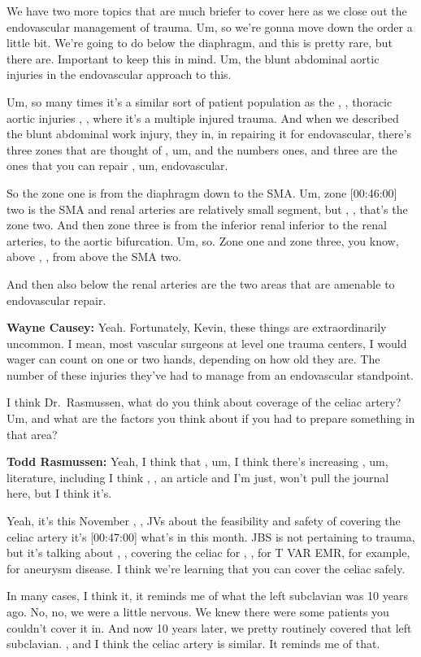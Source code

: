 \documentclass[
]{book}
\begin{document}
We have two more topics that are much briefer to cover here as we close
out the endovascular management of trauma. Um, so we're gonna move down
the order a little bit. We're going to do below the diaphragm, and this
is pretty rare, but there are. Important to keep this in mind. Um, the
blunt abdominal aortic injuries in the endovascular approach to this.

Um, so many times it's a similar sort of patient population as the , ,
thoracic aortic injuries , , where it's a multiple injured trauma. And
when we described the blunt abdominal work injury, they in, in repairing
it for endovascular, there's three zones that are thought of , um, and
the numbers ones, and three are the ones that you can repair , um,
endovascular.

So the zone one is from the diaphragm down to the SMA. Um, zone
{[}00:46:00{]} two is the SMA and renal arteries are relatively small
segment, but , , that's the zone two. And then zone three is from the
inferior renal inferior to the renal arteries, to the aortic
bifurcation. Um, so. Zone one and zone three, you know, above , , from
above the SMA two.

And then also below the renal arteries are the two areas that are
amenable to endovascular repair.

\textbf{Wayne Causey:} Yeah. Fortunately, Kevin, these things are
extraordinarily uncommon. I mean, most vascular surgeons at level one
trauma centers, I would wager can count on one or two hands, depending
on how old they are. The number of these injuries they've had to manage
from an endovascular standpoint.

I think Dr.~Rasmussen, what do you think about coverage of the celiac
artery? Um, and what are the factors you think about if you had to
prepare something in that area?

\textbf{Todd Rasmussen:} Yeah, I think that , um, I think there's increasing
, um, literature, including I think , , an article and I'm just, won't
pull the journal here, but I think it's.

Yeah, it's this November , , JVs about the feasibility and safety of
covering the celiac artery it's {[}00:47:00{]} what's in this month. JBS is
not pertaining to trauma, but it's talking about , , covering the celiac
for , , for T VAR EMR, for example, for aneurysm disease. I think we're
learning that you can cover the celiac safely.

In many cases, I think it, it reminds me of what the left subclavian was
10 years ago. No, no, we were a little nervous. We knew there were some
patients you couldn't cover it in. And now 10 years later, we pretty
routinely covered that left subclavian. , and I think the celiac artery
is similar. It reminds me of that.
\end{document}
